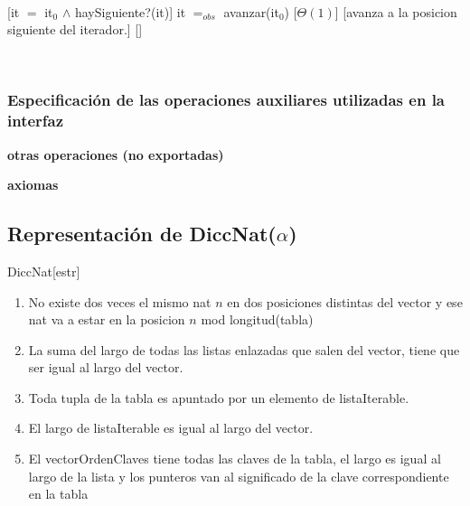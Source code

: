 ~

[it $=$ it$_0$ $\land$ haySiguiente?(it)]
{it $=_{obs}$ avanzar(it$_0$)}
[$\Theta(1)$]
[avanza a la posicion siguiente del iterador.]
[]

~

\subsubsection{Especificación de las operaciones auxiliares utilizadas en la interfaz}

\begin{tad}{}
	\textbf{otras operaciones (no exportadas)}


	\textbf{axiomas}

\end{tad}

\pagebreak

\subsection{Representación de DiccNat($\alpha$)}

\begin{Estructura}{DiccNat}[estr]
	\begin{Tupla}[estr]
	\end{Tupla}
\end{Estructura}

\begin{enumerate}
	\item No existe dos veces el mismo nat $n$ en dos posiciones distintas del vector y ese nat va a estar en la posicion $n$ mod longitud(tabla)
	\item La suma del largo de todas las listas enlazadas que salen del vector, tiene que ser igual al largo del vector.
	\item Toda tupla de la tabla es apuntado por un elemento de listaIterable.
	\item El largo de listaIterable es igual al largo del vector.
	\item El vectorOrdenClaves tiene todas las claves de la tabla, el largo es igual al largo de la lista y los punteros van al significado de la clave correspondiente en la tabla
\end{enumerate}

